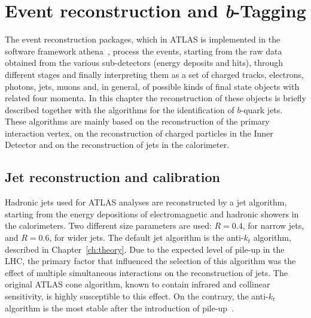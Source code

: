 %
%

\chapter{Event reconstruction and \emph{\textbf{b}}-Tagging }\label{ch:reco}


The event reconstruction packages, which in ATLAS is implemented in the software framework {\sc athena}~\cite{Calafiura2005zz}, process the events, starting from the raw data obtained from the various sub-detectors (energy deposits and hits),  %
through different stages and finally interpreting them as a set of charged tracks, electrons, photons, jets, muons and, in general, of possible kinds of final state objects with related four momenta.  
In this chapter the reconstruction of these objects is briefly described together with the algorithms for the identification of $b$-quark jets.  These algorithms are mainly based on the reconstruction of the primary interaction vertex, on the reconstruction of charged particles in the Inner Detector and on the reconstruction of jets in the calorimeter.   

\section{Jet reconstruction and calibration}\label{sec:ObjSelection}

Hadronic jets used for ATLAS analyses are reconstructed by a jet algorithm, starting from the energy depositions of electromagnetic and hadronic showers in the calorimeters.  Two different size parameters are used: $R = 0.4$, for narrow jets, and $R = 0.6$, for wider jets. The default jet algorithm is the anti-$k_t$ algorithm, described in Chapter~\ref{ch:theory}. Due to the expected level of pile-up in the LHC, the primary factor that influenced the selection of this algorithm was the effect of multiple simultaneous interactions on the reconstruction of jets. The original ATLAS cone algorithm, known to contain infrared and collinear sensitivity, is highly susceptible to this effect. On the contrary, the anti-$k_t$ algorithm is the most stable after the introduction of pile-up~\cite{Asquith:1311867}.  

